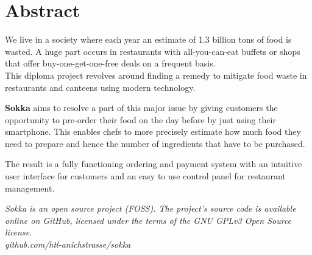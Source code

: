 \section*{Abstract}

We live in a society where each year an estimate of 1.3 billion tons of food is wasted. A huge
part occurs in restaurants with all-you-can-eat buffets or shops that offer buy-one-get-one-free
deals on a frequent basis. \cite{depta2018}\\This diploma project revolves around finding a remedy
to mitigate food waste in restaurants and canteens using modern technology.

\textbf{Sokka} aims to resolve a part of this major issue by giving customers the opportunity to
pre-order their food on the day before by just using their smartphone. This enables chefs to more
precisely estimate how much food they need to prepare and hence the number of ingredients that have
to be purchased.

The result is a fully functioning ordering and payment system with an intuitive user interface for
customers and an easy to use control panel for restaurant management.

\textit{Sokka is an open source project (FOSS). The project's source code is available online on
GitHub, licensed under the terms of the GNU GPLv3 Open Source license.
\\github.com/htl-anichstrasse/sokka}

\newpage